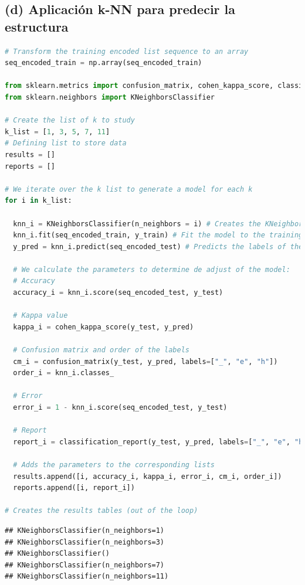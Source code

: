 \documentclass[
]{article}
\begin{document}
\hypertarget{d-aplicaciuxf3n-k-nn-para-predecir-la-estructura}{%
\subsection{(d) Aplicación k-NN para predecir la
estructura}\label{d-aplicaciuxf3n-k-nn-para-predecir-la-estructura}}

\begin{lstlisting}[language=Python]
# Transform the training encoded list sequence to an array
seq_encoded_train = np.array(seq_encoded_train)

from sklearn.metrics import confusion_matrix, cohen_kappa_score, classification_report
from sklearn.neighbors import KNeighborsClassifier

# Create the list of k to study
k_list = [1, 3, 5, 7, 11]
# Defining list to store data
results = []
reports = []

# We iterate over the k list to generate a model for each k
for i in k_list:

  knn_i = KNeighborsClassifier(n_neighbors = i) # Creates the KNeighborsClassifier object with k=i
  knn_i.fit(seq_encoded_train, y_train) # Fit the model to the training set
  y_pred = knn_i.predict(seq_encoded_test) # Predicts the labels of the test data
  
  # We calculate the parameters to determine de adjust of the model:
  # Accuracy
  accuracy_i = knn_i.score(seq_encoded_test, y_test)
  
  # Kappa value
  kappa_i = cohen_kappa_score(y_test, y_pred)
  
  # Confusion matrix and order of the labels
  cm_i = confusion_matrix(y_test, y_pred, labels=["_", "e", "h"])
  order_i = knn_i.classes_
  
  # Error
  error_i = 1 - knn_i.score(seq_encoded_test, y_test)
  
  # Report
  report_i = classification_report(y_test, y_pred, labels=["_", "e", "h"])
  
  # Adds the parameters to the corresponding lists
  results.append([i, accuracy_i, kappa_i, error_i, cm_i, order_i])
  reports.append([i, report_i])
  
# Creates the results tables (out of the loop)
\end{lstlisting}

\begin{lstlisting}
## KNeighborsClassifier(n_neighbors=1)
## KNeighborsClassifier(n_neighbors=3)
## KNeighborsClassifier()
## KNeighborsClassifier(n_neighbors=7)
## KNeighborsClassifier(n_neighbors=11)
\end{lstlisting}
\end{document}
